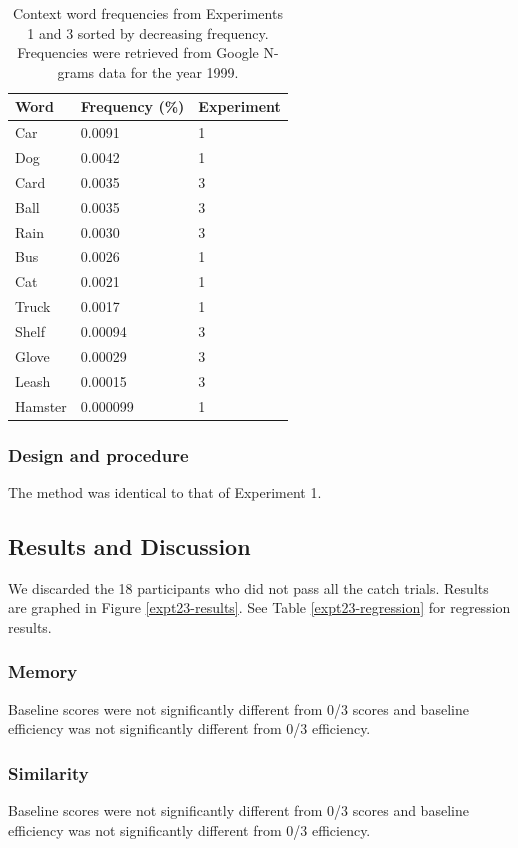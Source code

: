 \documentclass[man,floatsintext]{apa6}
\begin{document}
\begin{table}
  \begin{center}
  \caption{Context word frequencies from Experiments 1 and 3 sorted by decreasing frequency. Frequencies were retrieved from Google N-grams data for the year 1999.}
  \label{word-freqs}
  \footnotesize{
    \begin{tabular}{l l l}
      Word &  Frequency (\%) & Experiment\\
      \hline
      Car & 0.0091 & 1\\
      Dog & 0.0042 & 1\\
      Card & 0.0035 & 3\\
      Ball & 0.0035 & 3\\
      Rain & 0.0030 & 3\\
      Bus & 0.0026 & 1\\
      Cat & 0.0021 & 1\\
      Truck & 0.0017 & 1\\
      Shelf & 0.00094 & 3\\
      Glove & 0.00029 & 3\\
      Leash & 0.00015 & 3\\
      Hamster & 0.000099 & 1\\
      \hline
    \end{tabular}}
  \end{center}
\end{table}

\subsubsection{Design and procedure}
The method was identical to that of Experiment 1.

\subsection{Results and Discussion}
We discarded the 18 participants who did not pass all the catch trials. Results are graphed in Figure \ref{expt23-results}. See Table \ref{expt23-regression} for regression results.

\subsubsection{Memory}
Baseline scores were not significantly different from 0/3 scores and baseline efficiency was not significantly different from 0/3 efficiency.

\subsubsection{Similarity}
Baseline scores were not significantly different from 0/3 scores and baseline efficiency was not significantly different from 0/3 efficiency.
\end{document}
